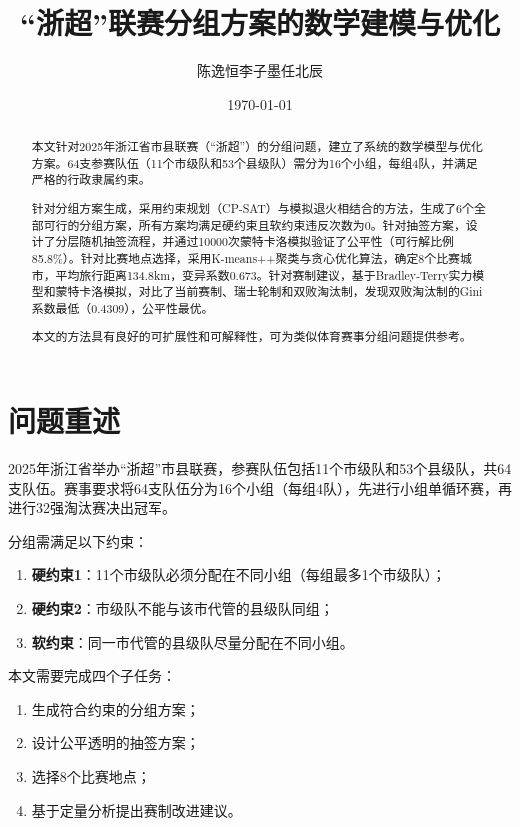 \documentclass[a4paper,12pt]{article}
\title{\textbf{``浙超''联赛分组方案的数学建模与优化}}
\author{陈逸恒\quad 李子墨\quad 任北辰}
\date{\today}
\begin{document}
\maketitle

\begin{abstract}
本文针对2025年浙江省市县联赛（``浙超''）的分组问题，建立了系统的数学模型与优化方案。64支参赛队伍（11个市级队和53个县级队）需分为16个小组，每组4队，并满足严格的行政隶属约束。

针对分组方案生成，采用约束规划（CP-SAT）与模拟退火相结合的方法，生成了6个全部可行的分组方案，所有方案均满足硬约束且软约束违反次数为0。针对抽签方案，设计了分层随机抽签流程，并通过10000次蒙特卡洛模拟验证了公平性（可行解比例85.8\%）。针对比赛地点选择，采用K-means++聚类与贪心优化算法，确定8个比赛城市，平均旅行距离134.8km，变异系数0.673。针对赛制建议，基于Bradley-Terry实力模型和蒙特卡洛模拟，对比了当前赛制、瑞士轮制和双败淘汰制，发现双败淘汰制的Gini系数最低（0.4309），公平性最优。

本文的方法具有良好的可扩展性和可解释性，可为类似体育赛事分组问题提供参考。
\end{abstract}

\newpage
\tableofcontents
\newpage

\section{问题重述}

2025年浙江省举办``浙超''市县联赛，参赛队伍包括11个市级队和53个县级队，共64支队伍。赛事要求将64支队伍分为16个小组（每组4队），先进行小组单循环赛，再进行32强淘汰赛决出冠军。

分组需满足以下约束：
\begin{enumerate}
    \item \textbf{硬约束1}：11个市级队必须分配在不同小组（每组最多1个市级队）；
    \item \textbf{硬约束2}：市级队不能与该市代管的县级队同组；
    \item \textbf{软约束}：同一市代管的县级队尽量分配在不同小组。
\end{enumerate}

本文需要完成四个子任务：
\begin{enumerate}
    \item 生成符合约束的分组方案；
    \item 设计公平透明的抽签方案；
    \item 选择8个比赛地点；
    \item 基于定量分析提出赛制改进建议。
\end{enumerate}
\end{document}
